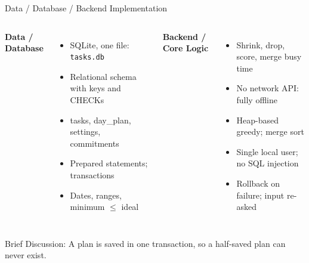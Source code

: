 \documentclass[aspectratio=169,11pt]{beamer}
\newcommand{\smallnote}[1]{%
\vspace{0.08cm}
{\scriptsize\color{GEUGrey}#1}
}
\begin{document}
\begin{frame}{Data / Database / Backend Implementation}

\begin{columns}[T,totalwidth=\textwidth]


\textbf{\color{GEUBlue}Data / Database}

\begin{itemize}\itemsep3pt
    \item SQLite, one file: \texttt{tasks.db}
    \item Relational schema with keys and CHECKs
    \item tasks, day\_plan, settings, commitments
    \item Prepared statements; transactions
    \item Dates, ranges, minimum $\le$ ideal
\end{itemize}


\textbf{\color{GEUBlue}Backend / Core Logic}

\begin{itemize}\itemsep3pt
    \item Shrink, drop, score, merge busy time
    \item No network API: fully offline
    \item Heap-based greedy; merge sort
    \item Single local user; no SQL injection
    \item Rollback on failure; input re-asked
\end{itemize}

\end{columns}

\vfill

\smallnote{
Brief Discussion: A plan is saved in one transaction, so a half-saved plan can never exist.
}

\end{frame}
\end{document}
